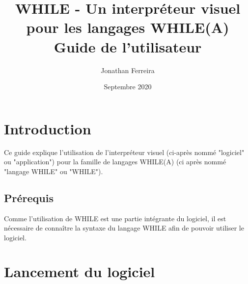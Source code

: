 \documentclass{article}
\author{Jonathan Ferreira}
\title{WHILE - Un interpréteur visuel pour les langages WHILE(A)\\
\large Guide de l'utilisateur}
\date{Septembre 2020}
\begin{document}
\maketitle

\clearpage
\newpage

\tableofcontents


\clearpage
\newpage






\section{Introduction}
\label{sec:introduction}

Ce guide explique l'utilisation de l'interpréteur visuel (ci-après nommé "logiciel" ou "application") pour la famille de langages WHILE(A) (ci après nommé "langage WHILE" ou "WHILE").

\subsection{Prérequis}

Comme l'utilisation de WHILE est une partie intégrante du logiciel, il est nécessaire de connaître la syntaxe du langage WHILE afin de pouvoir utiliser le logiciel.



\section{Lancement du logiciel}
\end{document}
